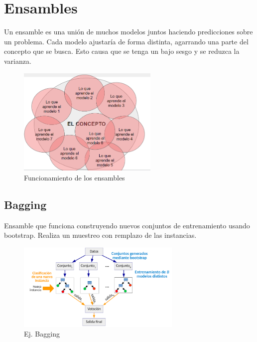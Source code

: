 \documentclass[titlepage,a4paper]{article}
\begin{document}
\newpage

\section{Ensambles}

Un ensamble es una unión de muchos modelos juntos haciendo predicciones sobre un problema. Cada modelo ajustaría de forma distinta, agarrando una parte del concepto que se busca. Esto causa que se tenga un bajo sesgo y se reduzca la varianza.

\begin{figure}[!htb]
    \centering
    \includegraphics[width=0.6\textwidth]{imagenesResumen/ConceptoEnsamble.PNG}
    \caption{Funcionamiento de los ensambles}
\end{figure}

\subsection{Bagging}

Ensamble que funciona construyendo nuevos conjuntos de entrenamiento usando bootstrap. Realiza un muestreo con remplazo de las instancias.

\begin{figure}[!htb]
    \centering
    \includegraphics[width=0.7\textwidth]{imagenesResumen/Bagging.PNG}
    \caption{Ej. Bagging}
\end{figure}
\end{document}

